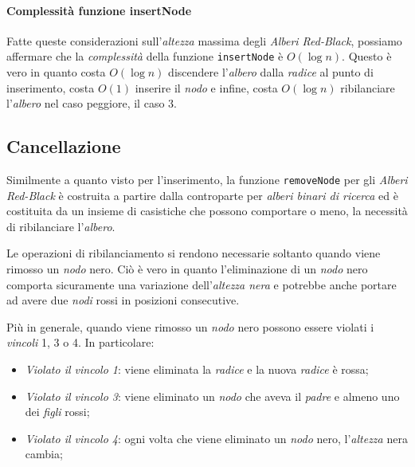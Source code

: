 \paragraph{Complessità funzione insertNode}
Fatte queste considerazioni sull'\emph{altezza} massima degli \emph{Alberi
Red-Black}, possiamo affermare che la \emph{complessità} della funzione
\texttt{insertNode} è $O(\log n)$. Questo è vero in quanto costa $O(\log n)$
discendere l'\emph{albero} dalla \emph{radice} al punto di inserimento, costa
$O(1)$ inserire il \emph{nodo} e infine, costa $O(\log n)$ ribilanciare
l'\emph{albero} nel caso peggiore, il caso 3.

\subsection{Cancellazione}
Similmente a quanto visto per l'inserimento, la funzione \texttt{removeNode} per
gli \emph{Alberi Red-Black} è costruita a partire dalla controparte per
\emph{alberi binari di ricerca} ed è costituita da un insieme di casistiche che
possono comportare o meno, la necessità di ribilanciare l'\emph{albero}.

Le operazioni di ribilanciamento si rendono necessarie soltanto quando viene
rimosso un \emph{nodo} nero. Ciò è vero in quanto l'eliminazione di un \emph{nodo}
nero comporta sicuramente una variazione dell'\emph{altezza nera} e potrebbe
anche portare ad avere due \emph{nodi} rossi in posizioni consecutive.

Più in generale, quando viene rimosso un \emph{nodo} nero possono essere violati
i \emph{vincoli} 1, 3 o 4. In particolare:
\begin{itemize}
    \item \emph{Violato il vincolo 1}: viene eliminata la \emph{radice} e la
    nuova \emph{radice} è rossa;
    \item \emph{Violato il vincolo 3}: viene eliminato un \emph{nodo} che
    aveva il \emph{padre} e almeno uno dei \emph{figli} rossi;
    \item \emph{Violato il vincolo 4}: ogni volta che viene eliminato un
    \emph{nodo} nero, l'\emph{altezza} nera cambia;
\end{itemize}

